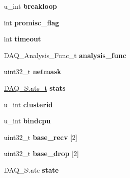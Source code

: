 \begin{DoxyCompactItemize}
\item 
\hypertarget{struct__pfring__context_a55463a4063b51d922791797c0c4c3207}{
u\_\-int {\bfseries breakloop}}
\label{struct__pfring__context_a55463a4063b51d922791797c0c4c3207}

\item 
\hypertarget{struct__pfring__context_a124e73d9da52fba03c7bc0484e7c2395}{
int {\bfseries promisc\_\-flag}}
\label{struct__pfring__context_a124e73d9da52fba03c7bc0484e7c2395}

\item 
\hypertarget{struct__pfring__context_a03e6b58f5b6392886e71fbd88aaabd37}{
int {\bfseries timeout}}
\label{struct__pfring__context_a03e6b58f5b6392886e71fbd88aaabd37}

\item 
\hypertarget{struct__pfring__context_a6a47d7381f59746cfcd6ee6273df6a1e}{
DAQ\_\-Analysis\_\-Func\_\-t {\bfseries analysis\_\-func}}
\label{struct__pfring__context_a6a47d7381f59746cfcd6ee6273df6a1e}

\item 
\hypertarget{struct__pfring__context_a5c02ff7be62d5c138e4948779ccd40c6}{
uint32\_\-t {\bfseries netmask}}
\label{struct__pfring__context_a5c02ff7be62d5c138e4948779ccd40c6}

\item 
\hypertarget{struct__pfring__context_a3c979dd00fe0f058f7d4f61204bf6a01}{
\hyperlink{struct__daq__stats}{DAQ\_\-Stats\_\-t} {\bfseries stats}}
\label{struct__pfring__context_a3c979dd00fe0f058f7d4f61204bf6a01}

\item 
\hypertarget{struct__pfring__context_a71816b05ca41e2b1f455a5d6e864c180}{
u\_\-int {\bfseries clusterid}}
\label{struct__pfring__context_a71816b05ca41e2b1f455a5d6e864c180}

\item 
\hypertarget{struct__pfring__context_a33c82772f7ddb15331f93cff86c4ee27}{
u\_\-int {\bfseries bindcpu}}
\label{struct__pfring__context_a33c82772f7ddb15331f93cff86c4ee27}

\item 
\hypertarget{struct__pfring__context_a55ae203c9a74586858592567c1632b14}{
uint32\_\-t {\bfseries base\_\-recv} \mbox{[}2\mbox{]}}
\label{struct__pfring__context_a55ae203c9a74586858592567c1632b14}

\item 
\hypertarget{struct__pfring__context_a5fd5b8917201296ebd8bc9bf7c80b819}{
uint32\_\-t {\bfseries base\_\-drop} \mbox{[}2\mbox{]}}
\label{struct__pfring__context_a5fd5b8917201296ebd8bc9bf7c80b819}

\item 
\hypertarget{struct__pfring__context_a436aedc686079f7ec35061f08d41cf76}{
DAQ\_\-State {\bfseries state}}
\label{struct__pfring__context_a436aedc686079f7ec35061f08d41cf76}

\end{DoxyCompactItemize}


